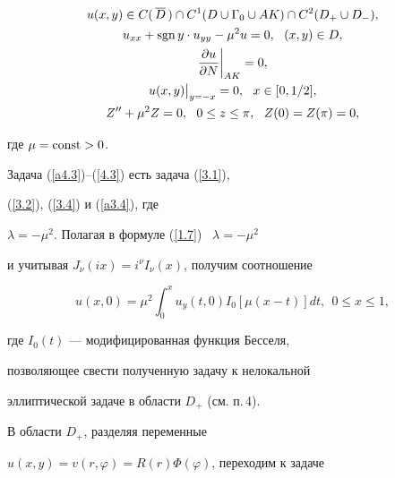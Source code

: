 \begin{gather}


u(x,y)\in {C}(\,\overline D\,)\cap


{C}^1(D\cup\Gamma_0\cup AK)\cap 


{C}^2(D_+\cup D_-),\label{a4.3} \\


%


u_{xx}+\sgn y\cdot u_{yy}-\mu^2u=0,\ \ (x,y)\in D,\label{4.2} \\


%


\frac{\partial u}{\partial N}\bigg|_{AK}=0,\label{a4.4} \\


%


u(x,y)\big|_{y=-x}=0,\ \ x\in [0,1/2],\label{4.3} \\


%


Z''+\mu^2Z=0,\ \ 0\leq z\leq\pi,\ \ Z(0)=Z(\pi)=0,\label{4.4}


\end{gather}


где $\mu=\operatorname{const}>0$.





Задача (\ref{a4.3})--(\ref{4.3}) есть задача (\ref{3.1}), 


(\ref{3.2}), (\ref{3.4}) и (\ref{a3.4}), где


$\lambda=-\mu^2$. Полагая в формуле (\ref{1.7}) \ $\lambda=-\mu^2$


и учитывая $J_\nu(ix)=i^\nu I_\nu (x)$, получим соотношение


\begin{equation}


u(x,0)=\mu^2\int_0^x u_y(t,0)I_0[\mu(x-t)]dt,\ \ 0\le x\le 1,\label{4.5}


\end{equation}


где $I_0(t)$ --- модифицированная функция Бесселя,


позволяющее свести полученную задачу к нелокальной 


эллиптической задаче в области $D_+$ (см. п.\,4). 





В области $D_+$, разделяя переменные


$u(x,y)=v(r,\varphi)=R(r)\Phi(\varphi)$, переходим к задаче


